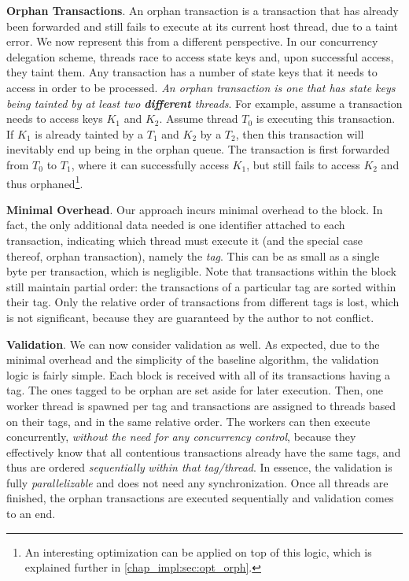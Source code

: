 \textbf{Orphan Transactions}. An orphan transaction is a transaction that has already been
forwarded and still fails to execute at its current host thread, due to a taint error. We now
represent this from a different perspective. In our concurrency delegation scheme, threads race to
access state keys and, upon successful access, they taint them. Any transaction has a number of state
keys that it needs to access in order to be processed. \textit{An orphan transaction is one that has
state keys being tainted by at least two \textbf{different} threads}. For example, assume a
transaction needs to access keys $K_{1}$ and $K_{2}$. Assume thread $T_{0}$ is executing this
transaction. If $K_{1}$ is already tainted by a $T_{1}$ and $K_{2}$ by a $T_{2}$, then this
transaction will inevitably end up being in the orphan queue. The transaction is first forwarded
from $T_{0}$ to $T_{1}$, where it can successfully access $K_{1}$, but still fails to access
$K_{2}$ and thus orphaned\footnote{An interesting optimization can be applied on top of this logic,
which is explained further in \ref{chap_impl:sec:opt_orph}.}.

\textbf{Minimal Overhead}. Our approach incurs minimal overhead to the block. In
fact, the only additional data needed is one identifier attached to each
transaction, indicating which thread must execute it (and the special case thereof, orphan
transaction), namely the \textit{tag}. This can be as small as a single byte per transaction,
which is negligible. Note that transactions within the block still maintain partial order: the
transactions of a particular tag are sorted within their tag. Only the relative order of
transactions from different tags is lost, which is not significant, because they are guaranteed by
the author to not conflict.

\textbf{Validation}. We can now consider validation as well. As expected, due to the minimal
overhead and the simplicity of the baseline algorithm, the validation logic is fairly simple. Each
block is received with all of its transactions having a tag. The ones tagged to be orphan are set
aside for later execution. Then, one worker thread is spawned per tag and transactions are assigned
to threads based on their tags, and in the same relative order. The workers can then execute
concurrently, \textit{without the need for any concurrency control}, because they effectively know
that all contentious transactions already have the same tags, and thus are ordered
\textit{sequentially} \textit{within that tag/thread}. In essence, the validation is fully
\textit{parallelizable} and does not need any synchronization. Once all threads are finished, the
orphan transactions are executed sequentially and validation comes to an end.

